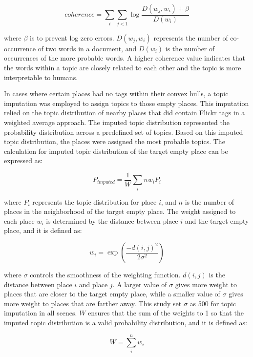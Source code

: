 \documentclass{article}
\theoremstyle{definition}
\theoremstyle{remark}
\begin{document}
\begin{equation} \label{eq:coherence_value}
    coherence = \sum_{i}\sum_{j<1}\log\frac{D(w_{j},w_{i})+\beta}{D(w_{i})}
\end{equation}

where $\beta$ is to prevent log zero errors. $D(w_{j},w_{i})$ represents the number of co-occurrence of two words in a document, and $D(w_{i})$ is the number of occurrences of the more probable words. A higher coherence value indicates that the words within a topic are closely related to each other and the topic is more interpretable to humans.

In cases where certain places had no tags within their convex hulls, a topic imputation was employed to assign topics to those empty places. This imputation relied on the topic distribution of nearby places that did contain Flickr tags in a weighted average approach. The imputed topic distribution represented the probability distribution across a predefined set of topics. Based on this imputed topic distribution, the places were assigned the most probable topics. The calculation for imputed topic distribution of the target empty place can be expressed as:

\begin{equation} \label{eq:topic_imputation}
    P_{imputed} = \frac{1}{W}\sum_{i}{n}w_{i}P_{i}
\end{equation}

where $P_{i}$ represents the topic distribution for place $i$, and $n$ is the number of places in the neighborhood of the target empty place. The weight assigned to each place $w_{i}$ is determined by the distance between place $i$ and the target empty place, and it is defined as:

\begin{equation} \label{eq:topic_imputation_w_i}
    w_{i} = \exp(\frac{-d(i,j)^2}{2\sigma^2})
\end{equation}

where $\sigma$ controls the smoothness of the weighting function. $d(i,j)$ is the distance between place $i$ and place $j$. A larger value of $\sigma$ gives more weight to places that are closer to the target empty place, while a smaller value of $\sigma$ gives more weight to places that are farther away. This study set $\sigma$ as 500 for topic imputation in all scenes. $W$ ensures that the sum of the weights to 1 so that the imputed topic distribution is a valid probability distribution, and it is defined as:

\begin{equation} \label{eq:topic_imputation_W}
    W = \sum_{i}^{n}w_{i}
\end{equation}
\end{document}

